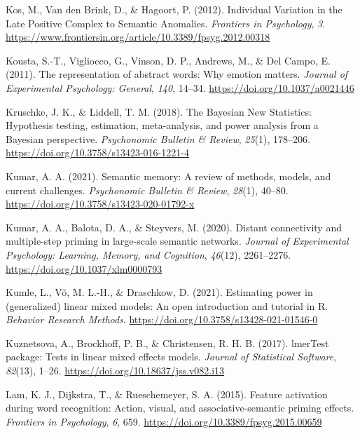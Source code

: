 \documentclass[
  12pt,
  man,floatsintext]{apa7}
\newlength{\cslhangindent}
\newlength{\cslentryspacingunit} %
\newenvironment{CSLReferences}[2] %
 {%
  \setlength{\parindent}{0pt}
  \ifodd #1
  \let\oldpar\par
  \def\par{\hangindent=\cslhangindent\oldpar}
  \fi
  \setlength{\parskip}{#2\cslentryspacingunit}
 }%
 {}
\begin{document}
\begin{CSLReferences}{1}{0}
\leavevmode{}%
Kos, M., Van den Brink, D., \& Hagoort, P. (2012). Individual {Variation} in the {Late Positive Complex} to {Semantic Anomalies}. \emph{Frontiers in Psychology}, \emph{3}. \url{https://www.frontiersin.org/article/10.3389/fpsyg.2012.00318}

\leavevmode{}%
Kousta, S.-T., Vigliocco, G., Vinson, D. P., Andrews, M., \& Del Campo, E. (2011). The representation of abstract words: {Why} emotion matters. \emph{Journal of Experimental Psychology: General}, \emph{140}, 14--34. \url{https://doi.org/10.1037/a0021446}

\leavevmode{}%
Kruschke, J. K., \& Liddell, T. M. (2018). The {Bayesian New Statistics}: {Hypothesis} testing, estimation, meta-analysis, and power analysis from a {Bayesian} perspective. \emph{Psychonomic Bulletin \& Review}, \emph{25}(1), 178--206. \url{https://doi.org/10.3758/s13423-016-1221-4}

\leavevmode{}%
Kumar, A. A. (2021). Semantic memory: {A} review of methods, models, and current challenges. \emph{Psychonomic Bulletin \& Review}, \emph{28}(1), 40--80. \url{https://doi.org/10.3758/s13423-020-01792-x}

\leavevmode{}%
Kumar, A. A., Balota, D. A., \& Steyvers, M. (2020). Distant connectivity and multiple-step priming in large-scale semantic networks. \emph{Journal of Experimental Psychology: Learning, Memory, and Cognition}, \emph{46}(12), 2261--2276. \url{https://doi.org/10.1037/xlm0000793}

\leavevmode{}%
Kumle, L., Võ, M. L.-H., \& Draschkow, D. (2021). Estimating power in (generalized) linear mixed models: {An} open introduction and tutorial in {R}. \emph{Behavior Research Methods}. \url{https://doi.org/10.3758/s13428-021-01546-0}

\leavevmode{}%
Kuznetsova, A., Brockhoff, P. B., \& Christensen, R. H. B. (2017). {lmerTest} package: Tests in linear mixed effects models. \emph{Journal of Statistical Software}, \emph{82}(13), 1--26. \url{https://doi.org/10.18637/jss.v082.i13}

\leavevmode{}%
Lam, K. J., Dijkstra, T., \& Rueschemeyer, S. A. (2015). Feature activation during word recognition: Action, visual, and associative-semantic priming effects. \emph{Frontiers in Psychology}, \emph{6}, 659. \url{https://doi.org/10.3389/fpsyg.2015.00659}


\end{CSLReferences}
\end{document}
